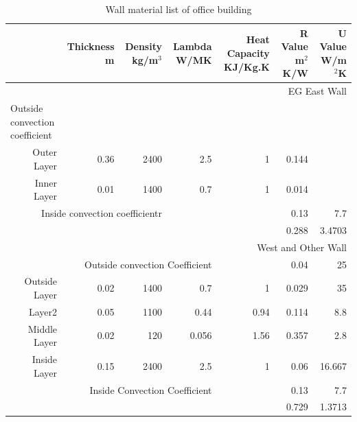 \documentclass[a4paper, oneside]{discothesis}
\begin{document}
			\newpage
			\begin{table}[h!]
			  \centering
			\caption{Wall material list of office building}
			    \begin{tabular}{rrrrrrr}
			    \toprule
			         & \multicolumn{1}{p{4em}}{Thickness \newline{}m} & \multicolumn{1}{p{3.145em}}{Density \newline{}kg/m$^3$} & \multicolumn{1}{p{3.285em}}{Lambda \newline{}W/MK} & \multicolumn{1}{p{3.57em}}{Heat Capacity\newline{} KJ/Kg.K} & \multicolumn{1}{p{2.93em}}{R Value \newline{}m$^2$K/W} & \multicolumn{1}{p{3.145em}}{U Value \newline{}W/m$^2$K} \\
			    \midrule
			    \multicolumn{7}{p{26.86em}}{EG East Wall} \\
			    \multicolumn{1}{l}{Outside convection coefficient} &      &      &      &      &      &  \\
			    \multicolumn{1}{p{6.785em}}{Outer Layer} & 0.36 & 2400 & 2.5  & 1    & 0.144 &  \\
			    \multicolumn{1}{p{6.785em}}{Inner Layer} & 0.01 & 1400 & 0.7  & 1    & 0.014 &  \\
			    \multicolumn{3}{p{13.93em}}{Inside convection coefficientr} &      &      & 0.13 & 7.7 \\
			         &      &      &      &      & 0.288 & 3.4703 \\
			    \midrule
			    \multicolumn{7}{p{26.86em}}{West and Other Wall} \\
			    \multicolumn{4}{p{17.215em}}{Outside convection Coefficient} &      & 0.04 & 25 \\
			    \multicolumn{1}{p{6.785em}}{Outside Layer} & 0.02 & 1400 & 0.7  & 1    & 0.029 & 35 \\
			    \multicolumn{1}{p{6.785em}}{Layer2} & 0.05 & 1100 & 0.44 & 0.94 & 0.114 & 8.8 \\
			    \multicolumn{1}{p{6.785em}}{Middle Layer} & 0.02 & 120  & 0.056 & 1.56 & 0.357 & 2.8 \\
			    \multicolumn{1}{p{6.785em}}{Inside Layer} & 0.15 & 2400 & 2.5  & 1    & 0.06 & 16.667 \\
			    \multicolumn{4}{p{17.215em}}{Inside Convection Coefficient} &      & 0.13 & 7.7 \\
			         &      &      &      &      & 0.729 & 1.3713 \\

\end{tabular}
\end{table}
\end{document}
